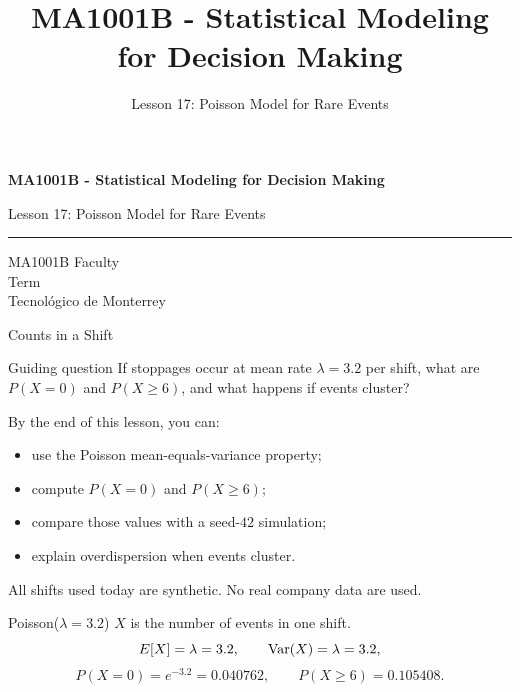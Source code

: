 \documentclass[aspectratio=169,10pt,english]{beamer}
\title{MA1001B - Statistical Modeling for Decision Making}
\subtitle{Lesson 17: Poisson Model for Rare Events}
\author{}
\institute{Tecnol\'ogico de Monterrey}
\date{}
\begin{document}
\begin{frame}[plain]
  \vspace{1.2cm}
  {\Large\bfseries MA1001B - Statistical Modeling for Decision Making\par}
  \vspace{0.7cm}
  {\large Lesson 17: Poisson Model for Rare Events\par}
  \vspace{0.7cm}
  {\color{TecRojo}\rule{\textwidth}{1.2pt}}
  \vspace{0.8cm}

  MA1001B Faculty\\[0.3cm]
  Term\\[0.3cm]
  Tecnol\'ogico de Monterrey
\end{frame}

\begin{frame}{Counts in a Shift}
  \begin{alertblock}{Guiding question}
    If stoppages occur at mean rate $\lambda=3.2$ per shift, what are
    $P(X=0)$ and $P(X\ge 6)$, and what happens if events cluster?
  \end{alertblock}

  \vspace{0.6em}
  By the end of this lesson, you can:
  \begin{itemize}
    \item use the Poisson mean-equals-variance property;
    \item compute $P(X=0)$ and $P(X\ge 6)$;
    \item compare those values with a seed-$42$ simulation;
    \item explain overdispersion when events cluster.
  \end{itemize}

  \vfill
  \scriptsize All shifts used today are synthetic. No real company data are used.
\end{frame}

\begin{frame}{Poisson($\lambda=3.2$)}
  \small
  $X$ is the number of events in one shift.
  \[
    E[X]=\lambda=3.2,\qquad \operatorname{Var}(X)=\lambda=3.2,
  \]
  \[
    P(X=0)=e^{-3.2}=0.040762,\qquad P(X\ge 6)=0.105408.
  \]
\end{frame}
\end{document}
